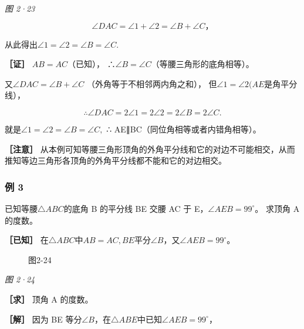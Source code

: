 \emph{图 2·23}

\[
\angle DAC = \angle 1 + \angle 2 = \angle B + \angle C\text{，}
\]

从此得出\(\angle 1 = \angle 2 = \angle B = \angle C.\)

\textbf{［证］} \(AB = AC\)（已知），
∴\(\angle B = \angle C\)（等腰三角形的底角相等）。

又\(\angle DAC = \angle B + \angle C\) （外角等于不相邻两内角之和），
但\(\angle 1 = \angle 2(AE\)是角平分线），

\[
\therefore \angle DAC = 2 \angle 1 = 2 \angle 2 = 2 \angle B = 2 \angle C.
\]

就是\(\angle 1 = \angle 2 = \angle B = \angle C,\) ∴
AE∥BC（同位角相等或者内错角相等）。

\textbf{［注意］}
从本例可知等腰三角形顶角的外角平分线和它的对边不可能相交，从而推知等边三角形各顶角的外角平分线都不能和它的对边相交。

\subsubsection{例 3}

已知等腰\(\triangle ABC\)的底角 B 的平分线 BE 交腰 AC 于
E，\(\angle AEB = 99^{\circ}\)。 求顶角 A 的度数。

\textbf{［已知］}
在\(\triangle ABC\)中\(AB = AC, BE\)平分\(\angle B\)，又\(\angle AEB = 99^{\circ}\)。

\begin{figure}
\centering
{}
\caption{图2-24}
\end{figure}

\emph{图 2·24}

\textbf{［求］} 顶角 A 的度数。

\textbf{［解］} 因为 BE
等分\(\angle B\)，在\(\triangle ABE\)中已知\(\angle AEB = 99^{\circ}\)，

